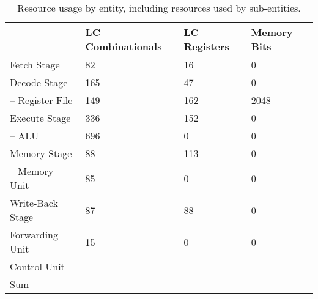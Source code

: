 \begin{table}[htb]
\centering
\caption{Resource usage by entity, including resources used by sub-entities.}
\begin{tabular}{llll}
	\toprule
	                     & LC Combinationals & LC Registers & Memory Bits \\
	\midrule
	Fetch Stage          &  82          & 16     &  0        \\
	Decode Stage         &  165         & 47     &  0        \\
	-- Register File     &  149         & 162    &  2048      \\
	Execute Stage        &  336         & 152    &  0          \\
	-- ALU               &  696         & 0      &  0         \\
	Memory Stage         &  88          & 113    &  0          \\
	-- Memory Unit       &  85          & 0      &  0          \\
	Write-Back Stage     &  87          & 88     &  0          \\
	Forwarding Unit      &  15          & 0      &  0           \\
	Control Unit         &              &        &             \\
	\cmidrule{1-4}
	Sum                  &              &        &             \\
\bottomrule
\end{tabular}
\end{table}

\begin{qa}
\end{qa}

